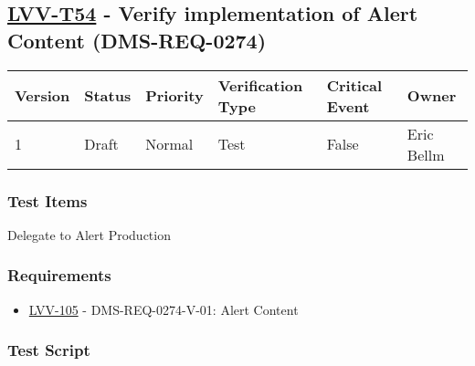 \hypertarget{lvv-t54---verify-implementation-of-alert-content-dms-req-0274}{%
\subsection{\texorpdfstring{\href{https://jira.lsstcorp.org/secure/Tests.jspa\#/testCase/LVV-T54}{LVV-T54}
- Verify implementation of Alert Content
(DMS-REQ-0274)}{LVV-T54 - Verify implementation of Alert Content (DMS-REQ-0274)}}\label{lvv-t54---verify-implementation-of-alert-content-dms-req-0274}}

\begin{longtable}[]{@{}llllll@{}}
\toprule
Version & Status & Priority & Verification Type & Critical Event &
Owner\tabularnewline
\midrule
\endhead
1 & Draft & Normal & Test & False & Eric Bellm\tabularnewline
\bottomrule
\end{longtable}

\hypertarget{test-items-30}{%
\subsubsection{Test Items}\label{test-items-30}}

Delegate to Alert Production

\hypertarget{requirements-31}{%
\subsubsection{Requirements}\label{requirements-31}}

\begin{itemize}
\tightlist
\item
  \href{https://jira.lsstcorp.org/browse/LVV-105}{LVV-105} -
  DMS-REQ-0274-V-01: Alert Content
\end{itemize}

\hypertarget{test-script-31}{%
\subsubsection{Test Script}\label{test-script-31}}

